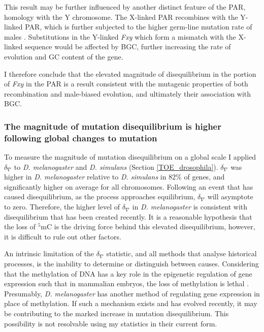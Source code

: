 This result may be further influenced by another distinct feature of the PAR, homology with the Y chromosome. The X-linked PAR recombines with the Y-linked PAR, which is further subjected to the higher germ-line mutation rate of males \citep{Huttley2000HowMutagenesis}. Substitutions in the Y-linked \textit{Fxy} which form a mismatch with the X-linked sequence would be affected by BGC, further increasing the rate of evolution and GC content of the gene. 

I therefore conclude that the elevated magnitude of disequilibrium in the portion of \textit{Fxy} in the PAR is a result consistent with the mutagenic properties of both recombination and male-biased evolution, and ultimately their association with BGC. 

\subsubsection{The magnitude of mutation disequilibrium is higher following global changes to mutation}

To measure the magnitude of mutation disequilibrium on a global scale I applied $\delta_\nabla$ to \textit{D. melanogaster} and \textit{D. simulans} (Section \ref{TOE_drosophila}). $\delta_\nabla$ was higher in \textit{D. melanogaster} relative to \textit{D. simulans} in 82\% of genes, and significantly higher on average for all chromosomes. Following an event that has caused disequilibrium, as the process approaches equilibrium, $\delta_\nabla$ will asymptote to zero. Therefore, the higher level of $\delta_\nabla$ in \textit{D. melanogaster} is consistent with disequilibrium that has been created recently. It is a reasonable hypothesis that the loss of $^5$mC is the driving force behind this elevated disequilibrium, however, it is difficult to rule out other factors. 

An intrinsic limitation of the $\delta_\nabla$ statistic, and all methods that analyse historical processes, is the inability to determine or distinguish between causes. Considering that the methylation of DNA has a key role in the epigenetic regulation of gene expression \citep{Holliday1975DNADevelopment, Compere1981DNACells, Lieberman1983UltravioletDemethylation} such that in mammalian embryos, the loss of methylation is lethal \citep{Panning1996DNAGenes}. Presumably, \textit{D. melanogaster}  has another method of regulating gene expression in place of methylation. If such a mechanism exists and has evolved recently, it may be contributing to the marked increase in mutation disequilibrium. This possibility is not resolvable using my statistics in their current form. 

